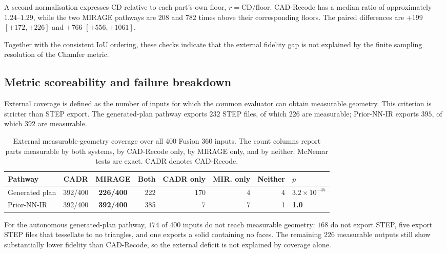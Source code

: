\documentclass[preprint,12pt]{elsarticle}
\begin{document}
A second normalisation expresses CD relative to each part's own floor, $r=\mathrm{CD}/\mathrm{floor}$. CAD-Recode has a median ratio of approximately $1.24$--$1.29$, while the two MIRAGE pathways are $208$ and $782$ times above their corresponding floors. The paired differences are $+199$ $[+172,+226]$ and $+766$ $[+556,+1061]$.

Together with the consistent IoU ordering, these checks indicate that the external fidelity gap is not explained by the finite sampling resolution of the Chamfer metric.

\subsection{Metric scoreability and failure breakdown}
\label{app:external_scoreability}

External coverage is defined as the number of inputs for which the common evaluator can obtain measurable geometry. This criterion is stricter than STEP export. The generated-plan pathway exports $232$ STEP files, of which $226$ are measurable; Prior-NN-IR exports $395$, of which $392$ are measurable.

\begin{table}[htbp]
  \centering
  \scriptsize
  \setlength{\tabcolsep}{3pt}

  \caption{External measurable-geometry coverage over all 400 Fusion 360
    inputs. The count columns report parts measurable by both systems, by
    CAD-Recode only, by MIRAGE only, and by neither. McNemar tests are exact.
    CADR denotes CAD-Recode.}
  \label{tab:ext_coverage}

  \begin{tabular}{lccrrrrl}
    \toprule
    Pathway
     & CADR
     & MIRAGE
     & Both
     & CADR only
     & MIR. only
     & Neither
     & $p$                 \\
    \midrule

    Generated plan
     & 392/400
     & \textbf{226/400}
     & 222
     & 170
     & 4
     & 4
     & $3.2\times10^{-45}$ \\

    Prior-NN-IR
     & 392/400
     & \textbf{392/400}
     & 385
     & 7
     & 7
     & 1
     & \textbf{1.0}        \\

    \bottomrule
  \end{tabular}
\end{table}

For the autonomous generated-plan pathway, $174$ of $400$ inputs do not reach measurable geometry: $168$ do not export STEP, five export STEP files that tessellate to no triangles, and one exports a solid containing no faces. The remaining $226$ measurable outputs still show substantially lower fidelity than CAD-Recode, so the external deficit is not explained by coverage alone.
\end{document}
